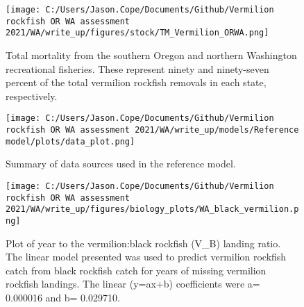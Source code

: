 \documentclass[11pt,
  english,
  a4paper,
]{article}
\begin{document}
\tagmcend\tagstructend


\begin{figure}
\centering
\texttt{[image: C:/Users/Jason.Cope/Documents/Github/Vermilion rockfish OR WA assessment 2021/WA/write\_up/figures/stock/TM\_Vermilion\_ORWA.png]}
\caption{Total mortality from the southern Oregon and northern Washington recreational fisheries. These represent ninety and ninety-seven percent of the total vermilion rockfish removals in each state, respectively.\label{fig:tm-plot}}
\end{figure}

\tagmcend\tagstructend


\begin{figure}
\centering
\texttt{[image: C:/Users/Jason.Cope/Documents/Github/Vermilion rockfish OR WA assessment 2021/WA/write\_up/models/Reference model/plots/data\_plot.png]}
\caption{Summary of data sources used in the reference model.\label{fig:data-plot}}
\end{figure}

\tagmcend\tagstructend


\begin{figure}
\centering
\texttt{[image: C:/Users/Jason.Cope/Documents/Github/Vermilion rockfish OR WA assessment 2021/WA/write\_up/figures/biology\_plots/WA\_black\_vermilion.png]}
\caption{Plot of year to the vermilion:black rockfish (V\_B) landing ratio. The linear model presented was used to predict vermilion rockfish catch from black rockfish catch for years of missing vermilion rockfish landings. The linear (y=ax+b) coefficients were a= 0.000016 and b= 0.029710.\label{fig:WA_black_vermilion}}
\end{figure}
\end{document}
